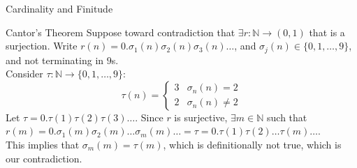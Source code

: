 \documentclass[10pt]{extarticle}
\begin{document}
\begin{problem}{Cardinality and Finitude}
\begin{problem}{Cantor's Theorem}
      Suppose toward contradiction that $\exists r:\mathbb{N} \rightarrow (0,1)$ that is a surjection. Write $r(n) = 0.\sigma_1(n)\sigma_2(n)\sigma_3(n)\dots$, and $\sigma_j(n) \in \{0,1,\dots,9\}$, and not terminating in $9$s.\\

      Consider $\tau: \mathbb{N} \rightarrow \{0,1,\dots,9\}$:
      \[
        \tau(n) = \begin{cases}
          3 & \sigma_n(n) = 2\\
          2 & \sigma_n(n) \neq 2
        \end{cases}
      \]
      Let $\tau = 0.\tau(1)\tau(2)\tau(3)\dots$. Since $r$ is surjective, $\exists m\in \mathbb{N}$ such that $r(m) = 0.\sigma_1(m)\sigma_2(m)\dots \sigma_m(m)\dots = \tau = 0.\tau(1)\tau(2)\dots\tau(m)\dots$.\\

      This implies that $\sigma_m(m) = \tau(m)$, which is definitionally not true, which is our contradiction.
    \end{problem}
  \end{problem}
\end{document}
